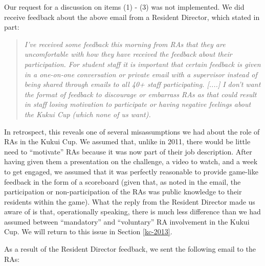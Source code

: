 \documentclass[]{article}
\begin{document}
Our request for a discussion on items (1) - (3) was not implemented.  We did receive
feedback about the above email from
a Resident Director, which stated in part:

\begin{quotation}
{\em 
I've received some feedback this morning from RAs that they are
uncomfortable with how they have received the feedback about their participation. For
student staff it is important that certain feedback is given in a one-on-one conversation
or private email with a supervisor instead of being shared through emails to all 40+ staff
participating. [....] I don't want the format of
feedback to discourage or embarrass RAs as that could result in staff losing motivation to
participate or having negative feelings about the Kukui Cup (which none of us want). 
}
\end{quotation}

In retrospect, this reveals one of several misassumptions we had about the role of RAs in
the Kukui Cup.  We assumed that, unlike in 2011, there would be little need to ``motivate'' RAs
because it was now part of their job description.  After having given them a presentation
on the challenge, a video to watch, and a week to get engaged, we assumed that it was
perfectly reasonable to provide game-like feedback in the form of a scoreboard (given
that, as noted in the email, the participation or non-participation of the RAs was public
knowledge to their residents within the game).  What the reply from the Resident Director
made us aware of is that, operationally speaking, there is much less difference than we
had assumed between ``mandatory'' and ``voluntary'' RA involvement in the
Kukui Cup.  We will return to this issue in Section \ref{kc-2013}.

As a result of the Resident Director feedback, we sent the following email to the RAs:
\end{document}
